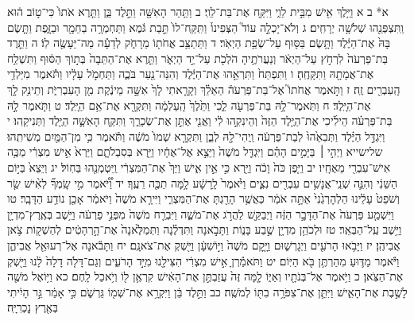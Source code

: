 \documentclass[twoside, openany, parskip=half, 11pt]{book}
\begin{document}
א* ב א וַיֵּ֥לֶךְ אִ֖ישׁ מִבֵּ֣ית לֵוִ֑י וַיִּקַּ֖ח אֶת־בַּת־לֵוִֽי׃ ב וַתַּ֥הַר הָאִשָּׁ֖ה וַתֵּ֣לֶד בֵּ֑ן וַתֵּ֤רֶא אֹתוֹ֙ כִּי־ט֣וֹב ה֔וּא וַֽתִּצְפְּנֵ֖הוּ שְׁלֹשָׁ֥ה יְרָחִֽים׃ ג וְלֹא־יָכְלָ֣ה עוֹד֮ הַצְּפִינוֹ֒ וַתִּֽקַּֽח־לוֹ֙ תֵּ֣בַת גֹּ֔מֶא וַתַּחְמְרָ֥ה בַחֵמָ֖ר וּבַזָּ֑פֶת וַתָּ֤שֶׂם בָּהּ֙ אֶת־הַיֶּ֔לֶד וַתָּ֥שֶׂם בַּסּ֖וּף עַל־שְׂפַ֥ת הַיְאֹֽר׃ ד וַתֵּתַצַּ֥ב אֲחֹת֖וֹ מֵרָחֹ֑ק לְדֵעָ֕ה מַה־יֵּעָשֶׂ֖ה לֽוֹ׃ ה וַתֵּ֤רֶד בַּת־פַּרְעֹה֙ לִרְחֹ֣ץ עַל־הַיְאֹ֔ר וְנַעֲרֹתֶ֥יהָ הֹלְכֹ֖ת עַל־יַ֣ד הַיְאֹ֑ר וַתֵּ֤רֶא אֶת־הַתֵּבָה֙ בְּת֣וֹךְ הַסּ֔וּף וַתִּשְׁלַ֥ח אֶת־אֲמָתָ֖הּ וַתִּקָּחֶֽהָ׃ ו וַתִּפְתַּח֙ וַתִּרְאֵ֣הוּ אֶת־הַיֶּ֔לֶד וְהִנֵּה־נַ֖עַר בֹּכֶ֑ה וַתַּחְמֹ֣ל עָלָ֔יו וַתֹּ֕אמֶר מִיַּלְדֵ֥י הָֽעִבְרִ֖ים זֶֽה׃ ז וַתֹּ֣אמֶר אֲחֹתוֹ֮ אֶל־בַּת־פַּרְעֹה֒ הַאֵלֵ֗ךְ וְקָרָ֤אתִי לָךְ֙ אִשָּׁ֣ה מֵינֶ֔קֶת מִ֖ן הָעִבְרִיֹּ֑ת וְתֵינִ֥ק לָ֖ךְ אֶת־הַיָּֽלֶד׃ ח וַתֹּֽאמֶר־לָ֥הּ בַּת־פַּרְעֹ֖ה לֵ֑כִי וַתֵּ֙לֶךְ֙ הָֽעַלְמָ֔ה וַתִּקְרָ֖א אֶת־אֵ֥ם הַיָּֽלֶד׃ ט וַתֹּ֧אמֶר לָ֣הּ בַּת־פַּרְעֹ֗ה הֵילִ֜יכִי אֶת־הַיֶּ֤לֶד הַזֶּה֙ וְהֵינִקִ֣הוּ לִ֔י וַאֲנִ֖י אֶתֵּ֣ן אֶת־שְׂכָרֵ֑ךְ וַתִּקַּ֧ח הָאִשָּׁ֛ה הַיֶּ֖לֶד וַתְּנִיקֵֽהוּ׃ י וַיִּגְדַּ֣ל הַיֶּ֗לֶד וַתְּבִאֵ֙הוּ֙ לְבַת־פַּרְעֹ֔ה וַֽיְהִי־לָ֖הּ לְבֵ֑ן וַתִּקְרָ֤א שְׁמוֹ֙ מֹשֶׁ֔ה וַתֹּ֕אמֶר כִּ֥י מִן־הַמַּ֖יִם מְשִׁיתִֽהוּ׃ שלישייא וַיְהִ֣י ׀ בַּיָּמִ֣ים הָהֵ֗ם וַיִּגְדַּ֤ל מֹשֶׁה֙ וַיֵּצֵ֣א אֶל־אֶחָ֔יו וַיַּ֖רְא בְּסִבְלֹתָ֑ם וַיַּרְא֙ אִ֣ישׁ מִצְרִ֔י מַכֶּ֥ה אִישׁ־עִבְרִ֖י מֵאֶחָֽיו׃ יב וַיִּ֤פֶן כֹּה֙ וָכֹ֔ה וַיַּ֖רְא כִּ֣י אֵ֣ין אִ֑ישׁ וַיַּךְ֙ אֶת־הַמִּצְרִ֔י וַֽיִּטְמְנֵ֖הוּ בַּחֽוֹל׃ יג וַיֵּצֵא֙ בַּיּ֣וֹם הַשֵּׁנִ֔י וְהִנֵּ֛ה שְׁנֵֽי־אֲנָשִׁ֥ים עִבְרִ֖ים נִצִּ֑ים וַיֹּ֙אמֶר֙ לָֽרָשָׁ֔ע לָ֥מָּה תַכֶּ֖ה רֵעֶֽךָ׃ יד וַ֠יֹּ֠אמֶר מִ֣י שָֽׂמְךָ֞ לְאִ֨ישׁ שַׂ֤ר וְשֹׁפֵט֙ עָלֵ֔ינוּ הַלְהׇרְגֵ֙נִי֙ אַתָּ֣ה אֹמֵ֔ר כַּאֲשֶׁ֥ר הָרַ֖גְתָּ אֶת־הַמִּצְרִ֑י וַיִּירָ֤א מֹשֶׁה֙ וַיֹּאמַ֔ר אָכֵ֖ן נוֹדַ֥ע הַדָּבָֽר׃ טו וַיִּשְׁמַ֤ע פַּרְעֹה֙ אֶת־הַדָּבָ֣ר הַזֶּ֔ה וַיְבַקֵּ֖שׁ לַהֲרֹ֣ג אֶת־מֹשֶׁ֑ה וַיִּבְרַ֤ח מֹשֶׁה֙ מִפְּנֵ֣י פַרְעֹ֔ה וַיֵּ֥שֶׁב בְּאֶֽרֶץ־מִדְיָ֖ן וַיֵּ֥שֶׁב עַֽל־הַבְּאֵֽר׃ טז וּלְכֹהֵ֥ן מִדְיָ֖ן שֶׁ֣בַע בָּנ֑וֹת וַתָּבֹ֣אנָה וַתִּדְלֶ֗נָה וַתְּמַלֶּ֙אנָה֙ אֶת־הָ֣רְהָטִ֔ים לְהַשְׁק֖וֹת צֹ֥אן אֲבִיהֶֽן׃ יז וַיָּבֹ֥אוּ הָרֹעִ֖ים וַיְגָרְשׁ֑וּם וַיָּ֤קׇם מֹשֶׁה֙ וַיּ֣וֹשִׁעָ֔ן וַיַּ֖שְׁקְ אֶת־צֹאנָֽם׃ יח וַתָּבֹ֕אנָה אֶל־רְעוּאֵ֖ל אֲבִיהֶ֑ן וַיֹּ֕אמֶר מַדּ֛וּעַ מִהַרְתֶּ֥ן בֹּ֖א הַיּֽוֹם׃ יט וַתֹּאמַ֕רְןָ אִ֣ישׁ מִצְרִ֔י הִצִּילָ֖נוּ מִיַּ֣ד הָרֹעִ֑ים וְגַם־דָּלֹ֤ה דָלָה֙ לָ֔נוּ וַיַּ֖שְׁקְ אֶת־הַצֹּֽאן׃ כ וַיֹּ֥אמֶר אֶל־בְּנֹתָ֖יו וְאַיּ֑וֹ לָ֤מָּה זֶּה֙ עֲזַבְתֶּ֣ן אֶת־הָאִ֔ישׁ קִרְאֶ֥ן ל֖וֹ וְיֹ֥אכַל לָֽחֶם׃ כא וַיּ֥וֹאֶל מֹשֶׁ֖ה לָשֶׁ֣בֶת אֶת־הָאִ֑ישׁ וַיִּתֵּ֛ן אֶת־צִפֹּרָ֥ה בִתּ֖וֹ לְמֹשֶֽׁה׃ כב וַתֵּ֣לֶד בֵּ֔ן וַיִּקְרָ֥א אֶת־שְׁמ֖וֹ גֵּרְשֹׁ֑ם כִּ֣י אָמַ֔ר גֵּ֣ר הָיִ֔יתִי בְּאֶ֖רֶץ נׇכְרִיָּֽה׃
\end{document}

